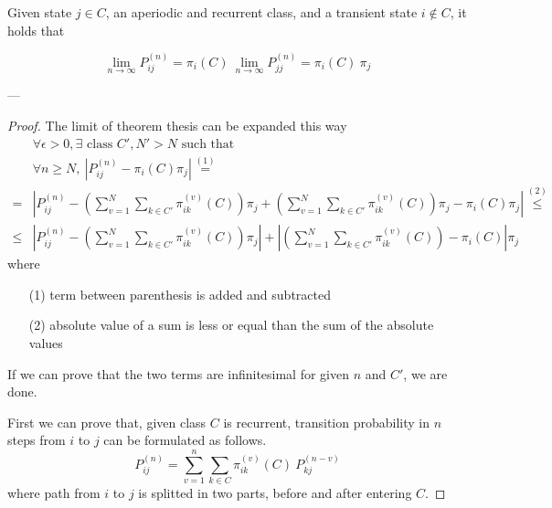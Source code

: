 	\begin{theorem}[3.1, KT p. 91] \label{th:3.1}
		Given state $j \in C$, an aperiodic and recurrent class, and a transient state $i \notin C$, it holds that

		$$ \lim_{n \to \infty } P_{ij}^{(n)} = \pi_i(C) ~ \lim_{n \to \infty } P_{jj}^{(n)} = \pi_i(C) ~ \pi_j $$
	\end{theorem}
	---
	\begin{proof}
		The limit of theorem thesis can be expanded this way
		\begin{equation}\begin{split} \label{eq:theorem_3.1_thesis}
			& \forall \epsilon > 0, \exists \text{ class } C', N'>N \text{ such that } \\
			& \forall n \ge N,~ \left| P_{ij}^{(n)} - \pi_i(C) \pi_j \right| \stackrel{(1)}{=} \\
			= & \left| P_{ij}^{(n)} - \left( \sum_{v = 1}^{N} \sum_{k \in C'} \pi_{ik}^{(v)}(C) \right) \pi_j +
				\left( \sum_{v = 1}^{N} \sum_{k \in C'} \pi_{ik}^{(v)}(C)\right)\pi_j - \pi_i(C)\pi_j \right| \stackrel{(2)}{\le} \\
			\le & \left| P_{ij}^{(n)} - \left( \sum_{v = 1}^{N} \sum_{k \in C'} \pi_{ik}^{(v)}(C) \right) \pi_j \right| +
				\left| \left( \sum_{v = 1}^{N} \sum_{k \in C'} \pi_{ik}^{(v)}(C)\right) - \pi_i(C) \right| \pi_j
		\end{split}\end{equation}
		where
		\begin{itemize}
			\item [(1)] term between parenthesis is added and subtracted
			\item [(2)] absolute value of a sum is less or equal than the sum of the absolute values
		\end{itemize}

		If we can prove that the two terms are infinitesimal for given $n$ and $C'$, we are done.
		\smallbreak

		First we can prove that, given class $C$ is recurrent, transition probability in $n$ steps from $i$ to $j$ can be formulated as follows.
		\begin{equation} \label{eq:n_step_in_class}
			P_{ij}^{(n)} = \sum_{v = 1}^{n} \sum_{k \in C} \pi_{ik}^{(v)}(C) ~ P_{kj}^{(n-v)}
		\end{equation}
		where path from $i$ to $j$ is splitted in two parts, before and after entering $C$.


\end{proof}
